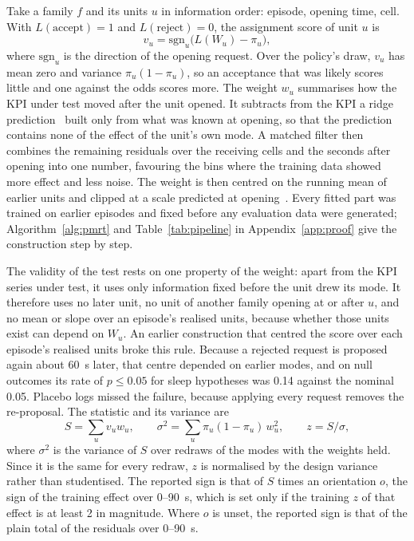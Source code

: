 Take a family $f$ and its units $u$ in information order: episode, opening time, cell. With $L(\text{accept}) = 1$ and
$L(\text{reject}) = 0$, the assignment score of unit $u$ is
\begin{equation}
v_u = \mathrm{sgn}_u \bigl( L(W_u) - \pi_u \bigr),
\label{eq:score}
\end{equation}
where $\mathrm{sgn}_u$ is the direction of the opening request. Over the policy's draw, $v_u$ has mean zero and
variance $\pi_u(1 - \pi_u)$, so an acceptance that was likely scores little and one against the odds scores more.
The weight $w_u$ summarises how the KPI under test moved after the unit opened. It subtracts from the KPI a ridge
prediction~\cite{hoerl1970ridge} built only from what was known at opening, so that the prediction contains none of
the effect of the unit's own mode. A matched filter then combines the remaining residuals over the receiving cells and
the seconds after opening into one number, favouring the bins where the training data showed more effect and less
noise. The weight is then centred on the running mean of earlier units and clipped at a scale predicted at
opening~\cite{huber1964robust}. Every fitted part was trained on earlier episodes and fixed before any evaluation data
were generated; Algorithm~\ref{alg:pmrt} and Table~\ref{tab:pipeline} in Appendix~\ref{app:proof} give the
construction step by step.

The validity of the test rests on one property of the weight: apart from the KPI series under test, it uses only
information fixed before the unit drew its mode. It therefore uses no later unit, no unit of another family opening at
or after $u$, and no mean or slope over an episode's realised units, because whether those units exist can depend on
$W_u$. An earlier construction that centred the score over each episode's realised units broke this rule. Because a
rejected request is proposed again about 60~s later, that centre depended on earlier modes, and on null outcomes its
rate of $p \le 0.05$ for sleep hypotheses was 0.14 against the nominal 0.05. Placebo logs missed the failure, because
applying every request removes the re-proposal. The statistic and its
variance are
\begin{equation}
S = \sum_u v_u w_u, \qquad
\sigma^2 = \sum_u \pi_u (1 - \pi_u)\, w_u^2, \qquad
z = S / \sigma,
\label{eq:stat}
\end{equation}
where $\sigma^2$ is the variance of $S$ over redraws of the modes with the weights held. Since it is the same for every
redraw, $z$ is normalised by the design variance rather than studentised. The reported sign is that of $S$ times an
orientation $o$, the sign of the training effect over 0--90~s, which is set only if the training $z$ of that effect is
at least 2 in magnitude. Where $o$ is unset, the reported sign is that of the plain total of the residuals over 0--90~s.

